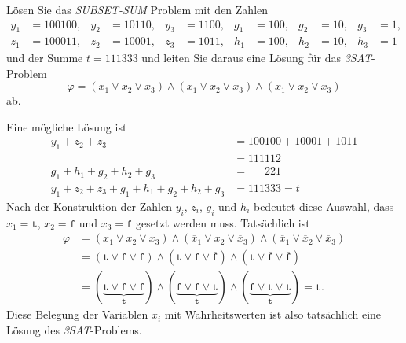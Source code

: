 Lösen Sie das \textit{SUBSET-SUM} Problem mit den Zahlen
\begin{align*}
y_1&=100100,&
y_2&=10110,&
y_3&=1100,&
g_1&=100,&
g_2&=10,&
g_3&=1,
\\
z_1&=100011,&
z_2&=10001,&
z_3&=1011,&
h_1&=100,&
h_2&=10,&
h_3&=1
\end{align*}
und der Summe $t=111333$ und leiten Sie daraus eine Lösung für 
das \textit{3SAT}-Problem
\[
\varphi
=
(x_1\vee x_2\vee x_3)
\wedge
(\overline{x}_1\vee x_2\vee \overline{x}_3)
\wedge
(\overline{x}_1\vee \overline{x}_2\vee \overline{x}_3)
\]
ab.


\begin{loesung}
Eine mögliche Lösung ist
\begin{align*}
y_1+z_2+z_3
&=
100100+10001+1011
\\
&=111112
\\
g_1+h_1+g_2+h_2+g_3
&= \phantom{000}221
\\
y_1+z_2+z_3
+
g_1+h_1+g_2+h_2+g_3
&=
111333=t
\end{align*}
Nach der Konstruktion der Zahlen $y_i$, $z_i$, $g_i$ und $h_i$ bedeutet
diese Auswahl, dass $x_1=\texttt{t}$, $x_2=\texttt{f}$ und
$x_3=\texttt{f}$ gesetzt werden muss.
Tatsächlich ist
\begin{align*}
\varphi
&=
(x_1\vee x_2\vee x_3)
\wedge
(\overline{x}_1\vee x_2\vee \overline{x}_3)
\wedge
(\overline{x}_1\vee \overline{x}_2\vee \overline{x}_3)
\\
&=
(
\texttt{t}
\vee
\texttt{f}
\vee
\texttt{f}
)
\wedge
(
\overline{\texttt{t}}
\vee
\texttt{f}
\vee
\overline{\texttt{f}}
)
\wedge
(
\overline{\texttt{t}}
\vee
\overline{\texttt{f}}
\vee
\overline{\texttt{f}}
)
\\
&=
(
\underbrace{
\texttt{t}
\vee
\texttt{f}
\vee
\texttt{f}
}_{\displaystyle \texttt{t}}
)
\wedge
(
\underbrace{
\texttt{f}
\vee
\texttt{f}
\vee
\texttt{t}
}_{\displaystyle \texttt{t}}
)
\wedge
(
\underbrace{
\texttt{f}
\vee
\texttt{t}
\vee
\texttt{t}
}_{\displaystyle \texttt{t}}
)
=
\texttt{t}.
\end{align*}
Diese Belegung der Variablen $x_i$ mit Wahrheitswerten ist also
tatsächlich eine Lösung des \textit{3SAT}-Problems.
\end{loesung}
